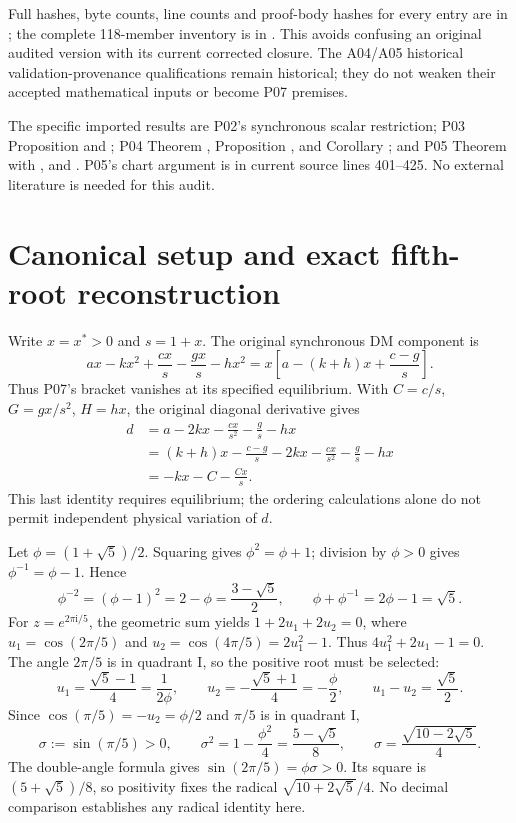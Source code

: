 \documentclass[11pt]{article}
\newcommand{\ii}{\mathrm{i}}
\begin{document}
Full hashes, byte counts, line counts and proof-body hashes for every entry
are in ; the complete 118-member
inventory is in . This avoids
confusing an original audited version with its current corrected closure.
The A04/A05 historical validation-provenance qualifications remain historical;
they do not weaken their accepted mathematical inputs or become P07 premises.

{\raggedright
The specific imported results are P02's synchronous scalar restriction;
P03 Proposition  and
; P04 Theorem ,
Proposition , and Corollary
; and P05 Theorem 
with ,  and
. P05's chart argument is in current
source lines 401--425. No external literature is needed for this audit.\par}

\section{Canonical setup and exact fifth-root reconstruction}
\label{sec:trig}
Write $x=x^*>0$ and $s=1+x$. The original synchronous DM component is
\[
 ax-kx^2+\frac{cx}{s}-\frac{gx}{s}-hx^2
 =x\left[a-(k+h)x+\frac{c-g}{s}\right].
\]
Thus P07's bracket vanishes at its specified equilibrium. With
$C=c/s$, $G=gx/s^2$, $H=hx$, the original diagonal derivative gives
\begin{align*}
 d&=a-2kx-\frac{cx}{s^2}-\frac gs-hx\\
  &=(k+h)x-\frac{c-g}{s}-2kx-\frac{cx}{s^2}-\frac gs-hx\\
  &=-kx-C-\frac{Cx}{s}.
\end{align*}
This last identity requires equilibrium; the ordering calculations alone
do not permit independent physical variation of $d$.

Let $\phi=(1+\sqrt5)/2$. Squaring gives $\phi^2=\phi+1$;
division by $\phi>0$ gives $\phi^{-1}=\phi-1$. Hence
\[
 \phi^{-2}=(\phi-1)^2=2-\phi=\frac{3-\sqrt5}{2},\qquad
 \phi+\phi^{-1}=2\phi-1=\sqrt5.
\]
For $z=e^{2\pi\ii/5}$, the geometric sum yields
$1+2u_1+2u_2=0$, where $u_1=\cos(2\pi/5)$ and
$u_2=\cos(4\pi/5)=2u_1^2-1$. Thus
$4u_1^2+2u_1-1=0$. The angle $2\pi/5$ is in quadrant I,
so the positive root must be selected:
\[
 u_1=\frac{\sqrt5-1}{4}=\frac1{2\phi},\qquad
 u_2=-\frac{\sqrt5+1}{4}=-\frac\phi2,\qquad
 u_1-u_2=\frac{\sqrt5}{2}.
\]
Since $\cos(\pi/5)=-u_2=\phi/2$ and $\pi/5$ is in quadrant I,
\[
 \sigma:=\sin(\pi/5)>0,\qquad
 \sigma^2=1-\frac{\phi^2}{4}=\frac{5-\sqrt5}{8},\qquad
 \sigma=\frac{\sqrt{10-2\sqrt5}}4.
\]
The double-angle formula gives $\sin(2\pi/5)=\phi\sigma>0$.
Its square is $(5+\sqrt5)/8$, so positivity fixes the radical
$\sqrt{10+2\sqrt5}/4$. No decimal comparison establishes any radical
identity here.
\end{document}
